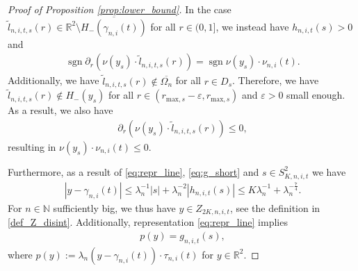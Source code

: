 \documentclass[11pt]{article}
\numberwithin{statement}{section}
\numberwithin{equation}{section}
\theoremstyle{remark}
\newcommand{\R}{\mathbb R} 				%
\newcommand{\N}{\mathbb N}
\newcommand{\eps}{\varepsilon}
\begin{document}
\begin{proof}[Proof of Proposition \ref{prop:lower_bound}]
       In the case
       $\tilde l_{n,i,t,s}(r) \in \R^2 \setminus
       \overline{H_-(\gamma_{n,i}(t))}$ for all $r\in (0,1]$, we
       instead have $h_{n,i,t}(s) >0$ and
        \begin{align}\label{eq:signs_something_2}
          \operatorname{sgn} 	\partial_r \left( \nu(y_{s}) \cdot \tilde
          l_{n,i,t,s}(r)\right) =  	\operatorname{sgn}
          \nu(y_{s})\cdot \nu_{n,i}(t). 
       \end{align}
       Additionally, we have
       $\tilde l_{n,i,t,s}(r) \not \in \overline{\Omega_n}$ for all
       $r \in D_s$.  Therefore, we have
       $\tilde l_{n,i,t,s}(r) \not \in H_-(y_{s})$ for all
       $r \in (r_{\mathrm{max},s}-\eps, r_{\mathrm{max},s})$ and
       $\eps>0$ small enough.  As a result, we also have
       \begin{align}
         \partial_r \left( \nu(y_{s}) \cdot \tilde l_{n,i,t,s}(r)\right) \leq 0,
       \end{align}
       resulting in $\nu(y_{s})\cdot \nu_{n,i}(t) \leq 0$.

       Furthermore, as a result of
       \eqref{eq:repr_line}, \eqref{eq:g_short} and
       $s \in S^2_{K,n,i,t}$ we have
        \begin{align}
        	 |y - \gamma_{n,i}(t)| \leq 
          \lambda_n^{-1} |s| + \lambda_n^{-2} |h_{n,i,t}(s)| \leq  K \lambda_n^{-1} +
          \lambda_n^{-\frac{7}{4}}. 
        \end{align}
        For $n \in \N$ sufficiently big, we thus have
        $y \in Z_{2K,n,i,t}$, see the definition in
        \eqref{def_Z_disint}.  Additionally, representation
        \eqref{eq:repr_line} implies
        \begin{align}
        		p(y) = g_{n,i,t}(s),
        \end{align}
        where
        $p(y) := \lambda_n \left(y - \gamma_{n,i}(t) \right) \cdot
        \tau_{n,i}(t)$ for $y \in \R^2$.
    

\end{proof}
\end{document}
